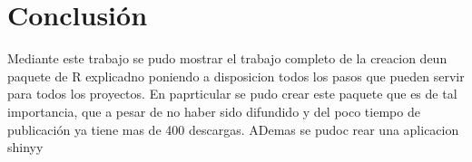 \chapter{Conclusión}


Mediante este trabajo se pudo mostrar el trabajo completo de la creacion deun paquete de R explicadno poniendo a disposicion todos los pasos que pueden servir para todos los proyectos. En paprticular se pudo crear este paquete que es de tal importancia, que a pesar de no haber sido difundido y del poco tiempo de publicación ya tiene mas de 400 descargas.
ADemas se pudoc rear una aplicacion shinyy
